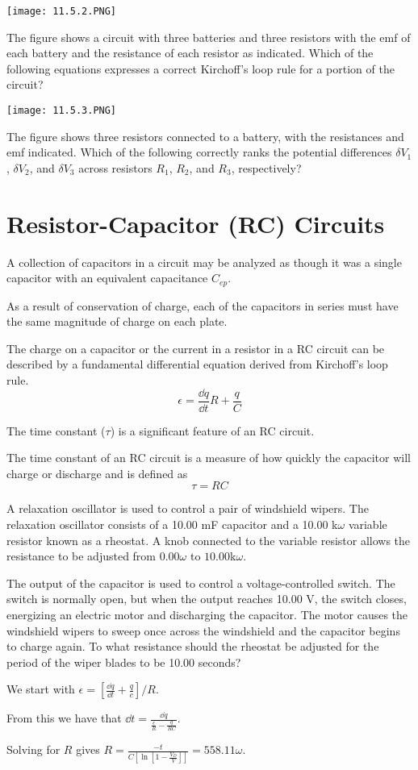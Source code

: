 \documentclass[../em.tex]{subfiles}
\begin{document}
\ex \begin{center}
    \texttt{[image: 11.5.2.PNG]}
\end{center}
The figure shows a circuit with three batteries and three resistors with the emf of each battery and the resistance of each resistor as indicated. Which of the following equations expresses a correct Kirchoff's loop rule for a portion of the circuit?

\ex \begin{center}
    \texttt{[image: 11.5.3.PNG]}
\end{center}
The figure shows three resistors connected to a battery, with the resistances and emf indicated. Which of the following correctly ranks the potential differences $\delta V_1$, $\delta V_2$, and $\delta V_3$ across resistors $R_1$, $R_2$, and $R_3$, respectively?

\section{Resistor-Capacitor (RC) Circuits}
A collection of capacitors in a circuit may be analyzed as though it was a single capacitor with an equivalent capacitance $C_{ep}$.

As a result of conservation of charge, each of the capacitors in series must have the same magnitude of charge on each plate.

The charge on a capacitor or the current in a resistor in a RC circuit can be described by a 
fundamental differential equation derived from Kirchoff's loop rule.
\[ \epsilon = \frac{\dd q}{\dd t}R+\frac{q}{C} \]

The time constant ($\tau$) is a significant feature of an RC circuit.

The time constant of an RC circuit is a measure of how quickly the capacitor will charge or discharge and is defined as 
\[\tau = RC\]

\begin{example}
    A relaxation oscillator is used to control a pair of windshield wipers. The relaxation oscillator consists of a 10.00 mF capacitor and a 10.00 k$\omega$ variable resistor known as a rheostat.
    A knob connected to the variable resistor allows the resistance to be adjusted from $0.00\omega$ to $10.00$k$\omega$. 

    The output of the capacitor is used to control a voltage-controlled switch. The switch is normally open, but when the output reaches 10.00 V, the switch closes, energizing an electric motor and discharging the capacitor. The motor 
    causes the windshield wipers to sweep once across the windshield and the capacitor begins to charge again. To what resistance should the rheostat be adjusted for the period of the wiper blades to be 10.00 seconds?

    We start with $\epsilon = [\frac{\dd q}{\dd t}+\frac{q}{c}]/R$.

    From this we have that $\dd t = \frac{\dd q}{\frac{\epsilon}{R}-\frac{q}{RC}}$.

    Solving for $R$ gives $R=\frac{-t}{C[\ln[1-\frac{V_D}{V}]]}=558.11 \omega$.
\end{example}
\end{document}
